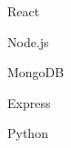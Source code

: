 \documentclass{article}
\begin{document}
\item React \\
\item Node.js \\
\item MongoDB \\
\item Express \\
\item Python \\


\end{document}
